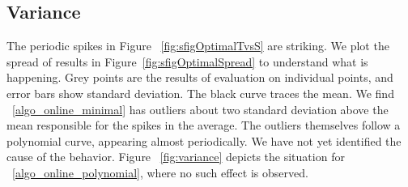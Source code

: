 \documentclass[sigplan,review,nonacm=true]{acmart}
\begin{document}
\subsection{Variance}
The periodic spikes in Figure ~\ref{fig:sfigOptimalTvsS} are striking. 
We plot the spread of results in Figure~\ref{fig:sfigOptimalSpread} to understand what is happening.
Grey points are the results of evaluation on individual points, and error bars show standard deviation. 
The black curve traces the mean.
We find ~\ref{algo_online_minimal} has outliers about two standard deviation above the mean responsible for the spikes in the average.
The outliers themselves follow a polynomial curve, appearing almost periodically.
We have not yet identified the cause of the behavior.
Figure ~\ref{fig:variance} depicts the situation for ~\ref{algo_online_polynomial}, where no such effect is observed.
\end{document}
